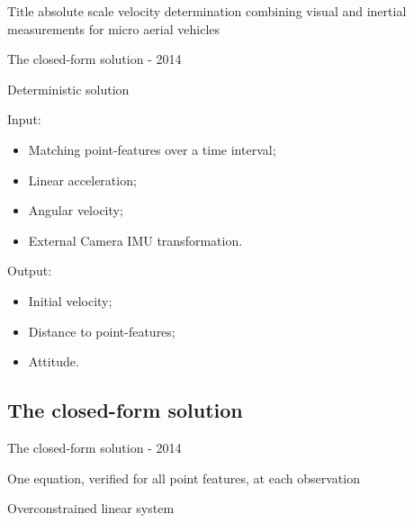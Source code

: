 \documentclass{beamer}
\begin{document}
\begin{frame}{Title}
absolute scale velocity determination combining visual and inertial measurements for micro aerial vehicles
\end{frame}




\begin{frame}{The closed-form solution - 2014}

Deterministic solution


Input:
\begin{itemize}
\item Matching point-features over a time interval; \hfill {}
\item Linear acceleration; \hfill {}
\item Angular velocity; \hfill {}
\item External Camera IMU transformation. \hfill {}
\end{itemize}

Output:
\begin{itemize}
\item Initial velocity; \hfill {}
\item Distance to point-features; \hfill {}
\item Attitude.
\end{itemize}

\end{frame}

\subsection{The closed-form solution}

\begin{frame}{The closed-form solution - 2014}

One equation, verified for all point features, at each observation


Overconstrained linear system

\end{frame}
\end{document}
